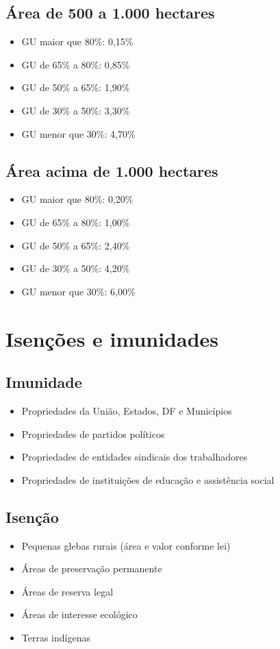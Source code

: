 \documentclass[12pt,a4paper]{article}
\begin{document}
\subsection{Área de 500 a 1.000 hectares}
\begin{itemize}
    \item GU maior que 80\%: 0,15\%
    \item GU de 65\% a 80\%: 0,85\%
    \item GU de 50\% a 65\%: 1,90\%
    \item GU de 30\% a 50\%: 3,30\%
    \item GU menor que 30\%: 4,70\%
\end{itemize}

\subsection{Área acima de 1.000 hectares}
\begin{itemize}
    \item GU maior que 80\%: 0,20\%
    \item GU de 65\% a 80\%: 1,00\%
    \item GU de 50\% a 65\%: 2,40\%
    \item GU de 30\% a 50\%: 4,20\%
    \item GU menor que 30\%: 6,00\%
\end{itemize}

\section{Isenções e imunidades}

\subsection{Imunidade}
\begin{itemize}
    \item Propriedades da União, Estados, DF e Municípios
    \item Propriedades de partidos políticos
    \item Propriedades de entidades sindicais dos trabalhadores
    \item Propriedades de instituições de educação e assistência social
\end{itemize}

\subsection{Isenção}
\begin{itemize}
    \item Pequenas glebas rurais (área e valor conforme lei)
    \item Áreas de preservação permanente
    \item Áreas de reserva legal
    \item Áreas de interesse ecológico
    \item Terras indígenas
\end{itemize}
\end{document}
